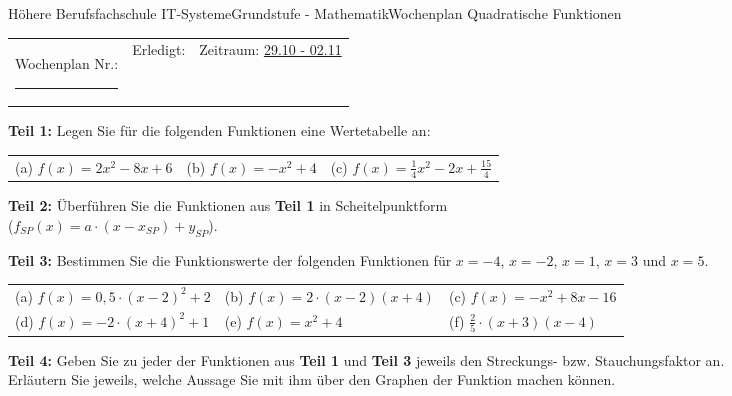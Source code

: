 \documentclass[oneside,openany,headings=optiontotoc,11pt,numbers=noenddot]{scrreprt}
\begin{document}
	\begin{worksheet}{Höhere Berufsfachschule IT-Systeme}{Grundstufe - Mathematik}{Wochenplan Quadratische Funktionen}
		\noindent
		\begin{tabularx}{\textwidth}{XXl}
			Wochenplan Nr.: \rule{0.15\textwidth}{1pt} & Erledigt: & Zeitraum: \underline{29.10 - 02.11}
		\end{tabularx}
	
		\begin{framed}
			\noindent
			\textbf{Teil 1:} Legen Sie für die folgenden Funktionen eine Wertetabelle an:\\
			\par\noindent
			\begin{tabularx}{\textwidth}{XXX}
				(a) \(f(x) = 2x^2 - 8x +6\) & (b) \(f(x) = -x^2 + 4\) & (c) \(f(x) = \frac{1}{4}x^2 -2x + \frac{15}{4}\)\\
			\end{tabularx}
		\end{framed}
		\begin{framed}
			\noindent
			\textbf{Teil 2:} Überführen Sie die Funktionen aus \textbf{Teil 1} in Scheitelpunktform\\
			(\(f_{SP}(x) = a\cdot(x - x_{SP}) + y_{SP}\)).\\
			\par\noindent
		\end{framed}
		\begin{framed}
			\noindent
			\textbf{Teil 3:} Bestimmen Sie die Funktionswerte der folgenden Funktionen für \(x = -4\), \(x = -2\), \(x = 1\), \(x = 3\) und \(x = 5\).\\
			\par\noindent
			\begin{tabularx}{\textwidth}{XXX}
				(a) \(f(x) = 0,5\cdot(x-2)^2 + 2\) & (b) \(f(x) = 2\cdot(x-2)(x+4)\) & (c) \(f(x) = -x^2 + 8x -16\)\\
				(d) \(f(x) = -2\cdot(x+4)^2 + 1\) & (e) \(f(x) = x^2 + 4\) & (f) \(\frac{2}{5}\cdot(x+3)(x-4)\)\\
			\end{tabularx}
		\end{framed}
		\begin{framed}
			\noindent
			\textbf{Teil 4:} Geben Sie zu jeder der Funktionen aus \textbf{Teil 1} und \textbf{Teil 3} jeweils den Streckungs- bzw. Stauchungsfaktor an.\\
			Erläutern Sie jeweils, welche Aussage Sie mit ihm über den Graphen der Funktion machen können.
		\end{framed}

\end{worksheet}
\end{document}
